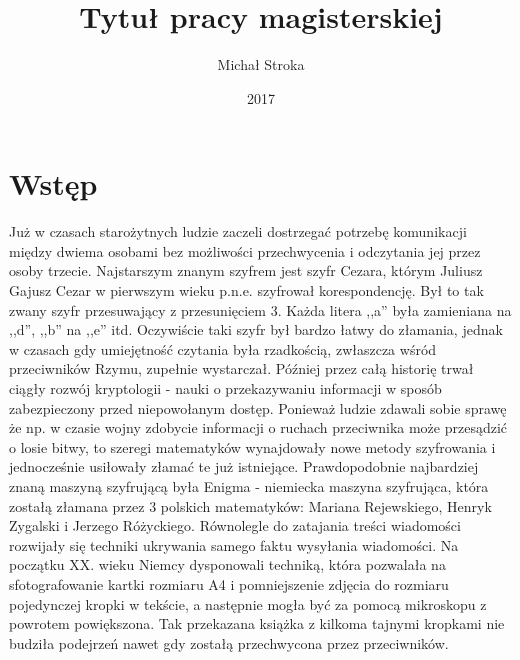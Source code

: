 \documentclass[oneside]{mgr}
\title{Tytuł pracy magisterskiej}
\author{Michał Stroka}
\date{2017} %
\begin{document}

\maketitle

\tableofcontents %

\chapter{Wstęp}
Już w czasach starożytnych ludzie zaczeli dostrzegać potrzebę komunikacji między dwiema osobami bez możliwości przechwycenia i odczytania jej przez osoby trzecie. Najstarszym znanym szyfrem jest szyfr Cezara, którym Juliusz Gajusz Cezar w pierwszym wieku p.n.e. szyfrował korespondencję. Był to tak zwany szyfr przesuwający z przesunięciem 3. Każda litera ,,a'' była zamieniana na ,,d'', ,,b'' na ,,e'' itd. Oczywiście taki szyfr był bardzo łatwy do złamania, jednak w czasach gdy umiejętność czytania była rzadkością, zwłaszcza wśród przeciwników Rzymu, zupełnie wystarczał. Później przez całą historię trwał ciągły rozwój kryptologii - nauki o przekazywaniu informacji w sposób zabezpieczony przed niepowołanym dostęp. Ponieważ ludzie zdawali sobie sprawę że np. w czasie wojny zdobycie informacji o ruchach przeciwnika może przesądzić o losie bitwy, to szeregi matematyków wynajdowały nowe metody szyfrowania i jednocześnie usiłowały złamać te już istniejące. Prawdopodobnie najbardziej znaną maszyną szyfrującą była Enigma - niemiecka maszyna szyfrująca, która zostałą złamana przez 3 polskich matematyków: Mariana Rejewskiego, Henryk Zygalski i Jerzego Różyckiego. Równolegle do zatajania treści wiadomości rozwijały się techniki ukrywania samego faktu wysyłania wiadomości. Na początku XX. wieku Niemcy dysponowali techniką, która pozwalała na sfotografowanie kartki rozmiaru A4 i pomniejszenie zdjęcia do rozmiaru pojedynczej kropki w tekście, a następnie mogła być za pomocą mikroskopu z powrotem powiększona. Tak przekazana książka z kilkoma tajnymi kropkami nie budziła podejrzeń nawet gdy zostałą przechwycona przez przeciwników.\\
\end{document}
